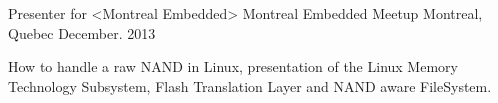 

\begin{cventries}

  \cventry
    {Presenter for <Montreal Embedded>} %
    {Montreal Embedded Meetup} %
    {Montreal, Quebec} %
    {December. 2013} %
    {
      \begin{cvitems} %
        \item {How to handle a raw NAND in Linux, presentation of the Linux Memory Technology Subsystem, Flash Translation Layer and NAND aware FileSystem.}
      \end{cvitems}
    }

\end{cventries}
